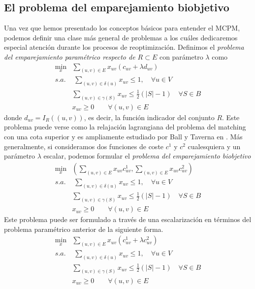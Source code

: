 \documentclass[twoside,a4paper,openright,12pt,tikz]{book}
\begin{document}
\subsection{El problema del emparejamiento biobjetivo}
Una vez que hemos presentado los conceptos básicos para entender el MCPM, podemos definir una clase más general de problemas a los cuáles dedicaremos especial atención durante los procesos de reoptimización. Definimos el \textit{problema del emparejamiento paramétrico respecto de $R\subset E$} con parámetro $\lambda$ como
\begin{align*}
\min_x & \sum_{(u,v) \in E}x_{uv} (c_{uv} + \lambda d_{uv})\\
s.a.&\;\sum_{(u,v)\in\delta(u)} x_{uv} \leq 1, \quad \forall u \in V\\
&\sum_{(u,v)\in \gamma(S)} x_{uv} \leq \frac{1}{2}(|S|-1)\quad \forall S \in B	\\
&x_{uv} \geq 0 \qquad \forall(u,v)\in E
\end{align*}
donde 
$
d_{uv} = I_R((u,v))$, es decir, la función indicador del conjunto $R$. Este problema puede verse como la relajación lagrangiana del problema del matching con una cota superior y es ampliamente estudiado por Ball y Taverna en \cite{balltab}. 
Más generalmente, si consideramos dos funciones de coste $c^1$ y $c^2$ cualesquiera y un parámetro $\lambda$ escalar, podemos formular el \textit{problema del emparejamiento biobjetivo}
\begin{align*}
\min_x & \left(\sum_{(u,v) \in E}x_{uv}c^1_{uv},\sum_{(u,v) \in E}x_{uv} c^2_{uv}\right)\\
s.a.&\;\sum_{(u,v)\in\delta(u)} x_{uv} \leq 1, \quad \forall u \in V\\
&\sum_{(u,v)\in \gamma(S)} x_{uv} \leq \frac{1}{2}(|S|-1)\quad \forall S \in B	\\
&x_{uv} \geq 0 \qquad \forall(u,v)\in E
\end{align*}
Este problema puede ser formulado a través de una escalarización en términos del problema paramétrico anterior de la siguiente forma.
\begin{align*}
\min_x & \sum_{(u,v) \in E}x_{uv}(c^1_{uv}+\lambda c^2_{uv})\\
s.a.&\;\sum_{(u,v)\in\delta(u)} x_{uv} \leq 1, \quad \forall u \in V\\
&\sum_{(u,v)\in \gamma(S)} x_{uv} \leq \frac{1}{2}(|S|-1)\quad \forall S \in B	\\
&x_{uv} \geq 0 \qquad \forall(u,v)\in E
\end{align*}
\end{document}
